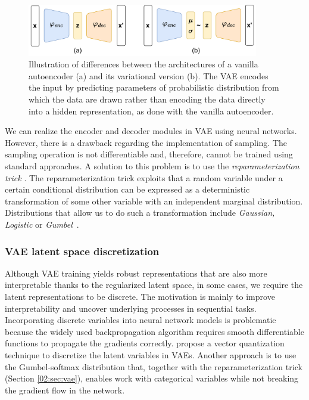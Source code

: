 \begin{figure}[t]
    \centering
    \includegraphics[width=0.9\textwidth]{images/enc-dec.pdf}
    \caption{Illustration of differences between the architectures of a vanilla autoencoder (a) and its variational version (b). The VAE encodes the input by predicting parameters of probabilistic distribution from which the data are drawn rather than encoding the data directly into a hidden representation, as done with the vanilla autoencoder.}
    \label{fig:vae-vs-ae}
\end{figure}
We can realize the encoder and decoder modules in VAE using neural networks.
However, there is a drawback regarding the implementation of sampling.
The sampling operation is not differentiable and, therefore, cannot be trained using standard approaches.
A solution to this problem is to use the \textit{reparameterization trick} \cite{kingma2013auto}.
The reparameterization trick exploits that a random variable under a certain conditional distribution can be expressed as a deterministic transformation of some other variable with an independent marginal distribution.
Distributions that allow us to do such a transformation include \textit{Gaussian, Logistic} or \textit{Gumbel}~\cite{jang2016categorical}.

\subsubsection{VAE latent space discretization}
\label{02:sec:vae_discrete}
Although VAE training yields robust representations that are also more interpretable thanks to the regularized latent space, in some cases, we require the latent representations to be discrete.
The motivation is mainly to improve interpretability and uncover underlying processes in sequential tasks.
Incorporating discrete variables into neural network models is problematic because the widely used backpropagation algorithm requires smooth differentiable functions to propagate the gradients correctly.
\cite{van2017neural} propose a vector quantization technique to discretize the latent variables in VAEs.
Another approach is to use the Gumbel-softmax distribution \cite{jang2016categorical} that, together with the reparameterization trick (Section \ref{02:sec:vae}), enables work with categorical variables while not breaking the gradient flow in the network.

